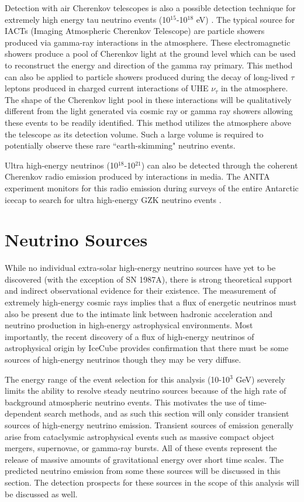 \documentclass{gatech-thesis}
\begin{document}
Detection with air Cherenkov telescopes is also a possible detection technique for extremely high energy tau neutrino events (10$^{15}$-10$^{18}$ eV) \cite{2013APh....41....7A}. The typical source for IACTs (Imaging Atmospheric Cherenkov Telescope) are particle showers produced via gamma-ray interactions in the atmosphere. These electromagnetic showers produce a pool of Cherenkov light at the ground level which can be used to reconstruct the energy and direction of the gamma ray primary. This method can also be applied to particle showers produced during the decay of long-lived $\tau$ leptons produced in charged current interactions of UHE $\nu_{\tau}$ in the atmosphere. The shape of the Cherenkov light pool in these interactions will be qualitatively different from the light generated via cosmic ray or gamma ray showers allowing these events to be readily identified. This method utilizes the atmosphere above the telescope as its detection volume. Such a large volume is required to potentially observe these rare ``earth-skimming" neutrino events.

Ultra high-energy neutrinos (10$^{18}$-10$^{21}$) can also be detected through the coherent Cherenkov radio emission produced by interactions in media. The ANITA experiment monitors for this radio emission during surveys of the entire Antarctic icecap to search for ultra high-energy GZK neutrino events \cite{2010PhRvD..82b2004G}. 
\chapter{Neutrino Sources}
While no individual extra-solar high-energy neutrino sources have yet to be discovered (with the exception of SN 1987A), there is strong theoretical support  and indirect observational evidence for their existence. The measurement of extremely high-energy cosmic rays implies that a flux of energetic neutrinos must also be present due to the intimate link between hadronic acceleration and neutrino production in high-energy astrophysical environments. Most importantly, the recent discovery of a flux of high-energy neutrinos of astrophysical origin by IceCube \cite{2013Sci...342E...1I} provides confirmation that there must be some sources of high-energy neutrinos though they may be very diffuse.

The energy range of the event selection for this analysis (10-10$^3$ GeV) severely limits the ability to resolve steady neutrino sources because of the high rate of background atmospheric neutrino events. This motivates the use of time-dependent search methods, and as such this section will only consider transient sources of high-energy neutrino emission. Transient sources of emission generally arise from cataclysmic astrophysical events such as massive compact object mergers, supernovae, or gamma-ray bursts. All of these events represent the release of massive amounts of gravitational energy over short time scales. The predicted neutrino emission from some these sources will be discussed in this section. The detection prospects for these sources in the scope of this analysis will be discussed as well.
\end{document}
